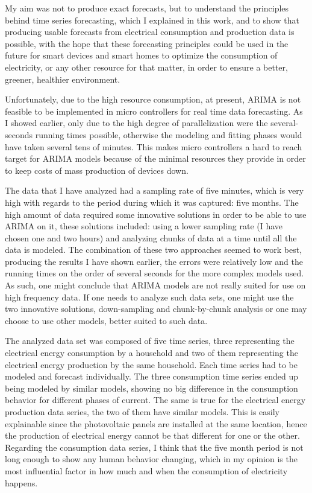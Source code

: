 \documentclass[12pt,a4paper,titlepage]{report}
\begin{document}
My aim was not to produce exact forecasts, but to understand the principles behind time series forecasting, which I explained in this work, and to show that producing usable forecasts from electrical consumption and production data is possible, with the hope that these forecasting principles could be used in the future for smart devices and smart homes to optimize the consumption of electricity, or any other resource for that matter,  in order to ensure a better, greener, healthier environment. 

Unfortunately, due to the high resource consumption, at present, ARIMA is not feasible to be implemented in micro controllers for real time data forecasting. As I showed earlier, only due to the high degree of parallelization were the several-seconds running times possible, otherwise the modeling and fitting phases would have taken several tens of minutes. This makes micro controllers a hard to reach target for ARIMA models because of the minimal resources they provide in order to keep costs of mass production of devices down.

The data that I have analyzed had a sampling rate of five minutes, which is very high with regards to the period during which it was captured: five months. The high amount of data required some innovative solutions in order to be able to use ARIMA on it, these solutions included: using a lower sampling rate (I have chosen one and two hours) and analyzing chunks of data at a time until all the data is modeled. The combination of these two approaches seemed to work best, producing the results I have shown earlier, the errors were relatively low and the running times on the order of several seconds for the more complex models used. As such, one might conclude that ARIMA models are not really suited for use on high frequency data. If one needs to analyze such data sets, one might use the two innovative solutions, down-sampling and chunk-by-chunk analysis or one may choose to use other models, better suited to such data.

The analyzed data set was composed of five time series, three representing the electrical energy consumption by a household and two of them representing the electrical energy production by the same household. Each time series had to be modeled and forecast individually. The three consumption time series ended up being modeled by similar models, showing no big difference in the consumption behavior for different phases of current. The same is true for the electrical energy production data series, the two of them have similar models. This is easily explainable since the photovoltaic panels are installed at the same location, hence the production of electrical energy cannot be that different for one or the other. Regarding the consumption data series, I think that the five month period is not long enough to show any human behavior changing, which in my opinion is the most influential factor in how much and when the consumption of electricity happens.
\end{document}
